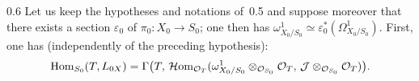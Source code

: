 \begin{remark}{0.6}
\label{III.0.6}
Let us keep the hypotheses and notations of~0.5%
{\renewcommand{\thefootnote}{(22)}}
and suppose moreover that there exists a section \(\varepsilon_{0}\) of
\(\pi_{0}\colon X_{0}\to S_{0}\); one then has
\(\omega^{1}_{X_{0}/S_{0}}\simeq\varepsilon_{0}^{*}(\Omega^{1}_{X_{0}/S_{0}})\).
First, one has (independently of the preceding hypothesis):
\[
\operatorname{Hom}_{S_{0}}(T,L_{0X})
=\Gamma\bigl(T,\,
\mathcal{H}\mathrm{om}_{\mathcal{O}_{T}}(\omega^{1}_{X_{0}/S_{0}}\otimes_{\mathcal{O}_{S_{0}}}\mathcal{O}_{T},\,
\mathcal{J}\otimes_{\mathcal{O}_{S_{0}}}\mathcal{O}_{T})\bigr).
\]
\end{remark}
